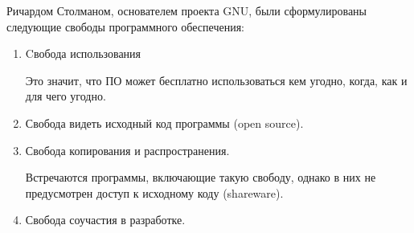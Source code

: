 \documentclass[a4paper, fleqn]{article}
\begin{document}
			Ричардом Столманом, основателем проекта GNU, были сформулированы следующие свободы программного обеспечения:
			
			\begin{enumerate}
				\item Cвобода использования
				
				Это значит, что ПО может бесплатно использоваться кем угодно, когда, как и для чего угодно.
				
				\item Свобода видеть исходный код программы (open source).
				
				\item Свобода копирования и распространения.
				
				Встречаются программы, включающие такую свободу, однако в них не предусмотрен доступ к исходному коду (shareware).
				\item Свобода соучастия в разработке.
			\end{enumerate}	
	
\end{document}
